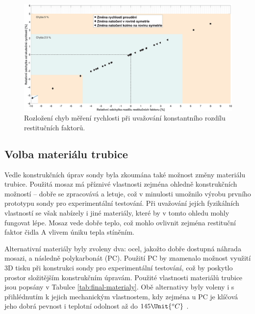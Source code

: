             \begin{figure}[ht!]
                \centering
                \includegraphics*[width=\textwidth]{500_FINAL/final_chyba_mereni.eps}
                \caption{Rozložení chyb měření rychlosti při uvažování konstantního rozdílu restitučních faktorů.}
                \label{fig:sonda-final-chyba-mereni}
            \end{figure}

        \newpage
        \subsection{Volba materiálu trubice}
            Vedle konstrukčních úprav sondy byla zkoumána také možnost změny materiálu trubice. Použitá mosaz má příznivé vlastnosti zejména ohledně konstrukčních možností – dobře se zpracovává a letuje, což v minulosti umožnilo výrobu prvního prototypu sondy pro experimentální testování. Při uvažování jejích fyzikálních vlastností se však nabízely i jiné materiály, které by v tomto ohledu mohly fungovat lépe. Mosaz vede dobře teplo, což mohlo ovlivnit zejména restituční faktor čidla A vlivem úniku tepla stíněním.

            Alternativní materiály byly zvoleny dva: ocel, jakožto dobře dostupná náhrada mosazi, a následně polykarbonát (PC). Použití PC by znamenalo možnost využití 3D tisku při konstrukci sondy pro experimentální testování, což by poskytlo prostor složitějším konstrukčním úpravám. Použité vlastnosti materiálů trubice jsou popsány v Tabulce \ref{tab:final-materialy}. Obě alternativy byly voleny i s přihlédnutím k jejich mechanickým vlastnostem, kdy zejména u PC je klíčová jeho dobrá pevnost i teplotní odolnost až do $145 \Unit{^oC}$ \cite{Morgan1976}.


